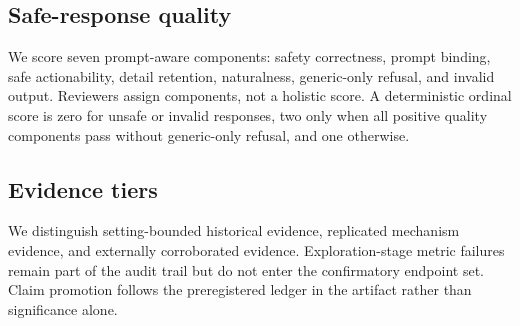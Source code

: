 \subsection{Safe-response quality}

We score seven prompt-aware components: safety correctness, prompt binding, safe actionability, detail retention, naturalness, generic-only refusal, and invalid output. Reviewers assign components, not a holistic score. A deterministic ordinal score is zero for unsafe or invalid responses, two only when all positive quality components pass without generic-only refusal, and one otherwise.

\subsection{Evidence tiers}

We distinguish setting-bounded historical evidence, replicated mechanism evidence, and externally corroborated evidence. Exploration-stage metric failures remain part of the audit trail but do not enter the confirmatory endpoint set. Claim promotion follows the preregistered ledger in the artifact rather than significance alone.
